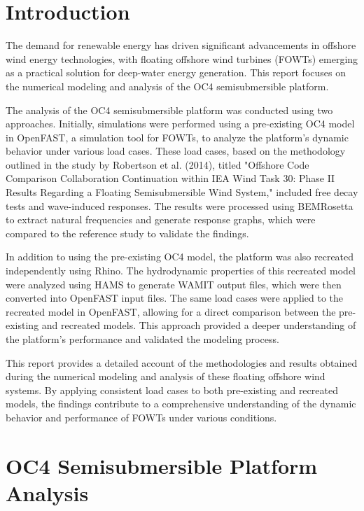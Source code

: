 \documentclass[a4paper]{article}
\begin{document}
\section{Introduction}

\hspace*{0.5cm}The demand for renewable energy has driven significant advancements in offshore wind energy technologies, with floating offshore wind turbines (FOWTs) emerging as a practical solution for deep-water energy generation. This report focuses on the numerical modeling and analysis of the OC4 semisubmersible platform. 

The analysis of the OC4 semisubmersible platform was conducted using two approaches. Initially, simulations were performed using a pre-existing OC4 model in OpenFAST, a simulation tool for FOWTs, to analyze the platform's dynamic behavior under various load cases. These load cases, based on the methodology outlined in the study by Robertson et al. (2014), titled "Offshore Code Comparison Collaboration Continuation within IEA Wind Task 30: Phase II Results Regarding a Floating Semisubmersible Wind System," included free decay tests and wave-induced responses. The results were processed using BEMRosetta to extract natural frequencies and generate response graphs, which were compared to the reference study to validate the findings.

In addition to using the pre-existing OC4 model, the platform was also recreated independently using Rhino. The hydrodynamic properties of this recreated model were analyzed using HAMS to generate WAMIT output files, which were then converted into OpenFAST input files. The same load cases were applied to the recreated model in OpenFAST, allowing for a direct comparison between the pre-existing and recreated models. This approach provided a deeper understanding of the platform's performance and validated the modeling process.

This report provides a detailed account of the methodologies and results obtained during the numerical modeling and analysis of these floating offshore wind systems. By applying consistent load cases to both pre-existing and recreated models, the findings contribute to a comprehensive understanding of the dynamic behavior and performance of FOWTs under various conditions.

\section{OC4 Semisubmersible Platform Analysis}
\end{document}

